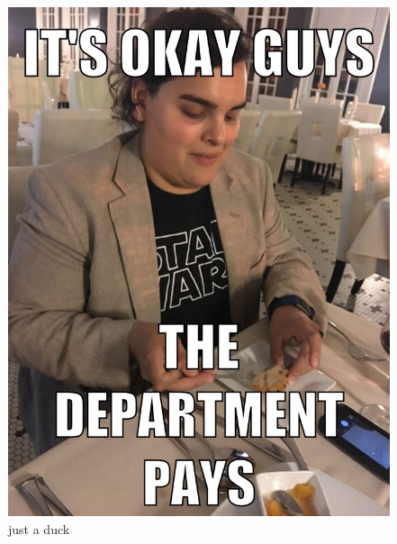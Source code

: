 

\begin{figure}[h!]
  \begin{center}
      \includegraphics[width=\textwidth]{./figures/sam_meme.JPG}
      \caption{just a duck}
      \label{fig:duck}
  \end{center}
\end{figure}
